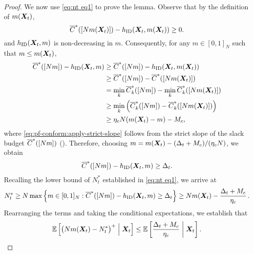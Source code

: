 \begin{proof}
We now use \eqref{eq:nt eq1} to prove the lemma. 
Observe that by the definition of $m({\bm{X}}_t)$, 
\[
    \overline{C}^*([Nm({\bm{X}}_t)])-h_{\textnormal{ID}}({\bm{X}}_t,m({\bm{X}}_t)) \geq 0.
\]
and $h_{\textnormal{ID}}({\bm{X}}_t,m)$ is non-decreasing in $m$. Consequently, for any $m\in [0,1]_N$ such that $m\leq m({\bm{X}}_t)$, 
\begin{align}
    \nonumber
    \overline{C}^*([Nm])-h_{\textnormal{ID}}({\bm{X}}_t,m) 
    &\geq \overline{C}^*([Nm])-h_{\textnormal{ID}}({\bm{X}}_t,m({\bm{X}}_t)) \\
    \nonumber
    &\geq  \overline{C}^*([Nm]) - \overline{C}^*([Nm({\bm{X}}_t)]) \\\nonumber
    &=\min_k \overline{C}^*_k([Nm])-\min_k \overline{C}^*_k([Nm({\bm{X}}_t)])\\\nonumber
    &\geq \min_k \left(\overline{C}^*_k([Nm]) - \overline{C}^*_k([Nm({\bm{X}}_t)])\right)
    \label{eq:pf-conform:apply-strict-slope}\\
    &\geq \eta_cN(m({\bm{X}}_t)-m)-M_c,
\end{align}
where \eqref{eq:pf-conform:apply-strict-slope} follows from the strict slope of the slack budget $\overline{C}^*([Nm])$ (). 
Therefore, choosing $m = m({\bm{X}}_t) - (\Delta_t+M_c)/(\eta_c N)$, we obtain
\begin{align*}
   \overline{C}^*([Nm])-h_{\textnormal{ID}}({\bm{X}}_t,m)\geq \Delta_t.
\end{align*}
Recalling the lower bound of $N_t^*$ established in \eqref{eq:nt eq1}, we arrive at
\begin{align*}
    N_t^*\geq N\max\left\{ m\in[0,1]_N: \overline{C}^*([Nm])-h_{\textnormal{ID}}({\bm{X}}_t,m)\geq\Delta_t \right\} \geq Nm({\bm{X}}_t)-\frac{\Delta_t +M_c}{\eta_c}\,.
\end{align*}
Rearranging the terms and taking the conditional expectations, we establish that
\begin{equation}
    \label{eq:pf-conform:bound-in-terms-of-E-delta}
    \mathbb{E}\left[\big(Nm({\bm{X}}_t) - N_t^*\big)^+ \;\middle|\; {\bm{X}}_t\right] \leq \mathbb{E}\left[\frac{\Delta_t+M_c}{\eta_c} \;\middle|\; {\bm{X}}_t\right]. 
\end{equation}



\end{proof}
